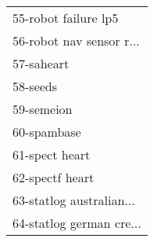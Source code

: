 \begin{table}[h]
\begin{center}
\begin{tabular}{l}
55-robot failure lp5 &  \\
56-robot nav sensor r... &  \\
57-saheart &  \\
58-seeds &  \\
59-semeion &  \\
60-spambase &  \\ \hline
61-spect heart &  \\
62-spectf heart &  \\
63-statlog australian... &  \\
64-statlog german cre... &  \\\end{tabular}\label{stratsALCKappa1Allallb}
\end{center}
\end{table}
